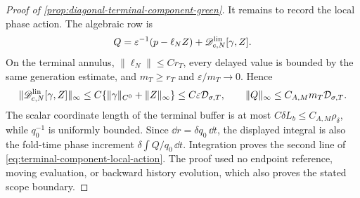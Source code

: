 \begin{proof}[Proof of
\cref{prop:diagonal-terminal-component-green}]
It remains to record the local phase action.  The algebraic row is
\[
 Q=\varepsilon^{-1}(p-\ell_NZ)
       +\mathscr D_{c,N}^{\rm lin}[\gamma,Z].
\]
On the terminal annulus, \(\|\ell_N\|\le C r_T\), every delayed value
is bounded by the same generation estimate, and
\(m_T\ge r_T\) and \(\varepsilon/m_T\to0\).  Hence
\[
 \|\mathscr D_{c,N}^{\rm lin}[\gamma,Z]\|_\infty
 \le C\{\|\gamma\|_{C^0}+\|Z\|_\infty\}
 \le C\varepsilon\mathcal D_{\sigma,T},
 \qquad
 \|Q\|_\infty\le C_{A,M}m_T\mathcal D_{\sigma,T}.
\]
The scalar coordinate length of the terminal buffer is at most
\(C\delta L_b\le C_{A,M}\rho_\delta\), while \(q_0^{-1}\) is uniformly
bounded.  Since \(\dd r=\delta q_0\,\dd t\), the displayed integral is
also the fold-time phase increment \(\delta\int Q/q_0\,\dd t\).
Integration proves the second line of
\cref{eq:terminal-component-local-action}.  The proof used no endpoint
reference, moving evaluation, or backward history evolution, which also
proves the stated scope boundary.
\end{proof}

